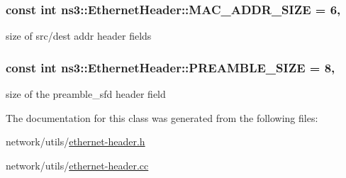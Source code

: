 \subsubsection[{\texorpdfstring{M\+A\+C\+\_\+\+A\+D\+D\+R\+\_\+\+S\+I\+ZE}{MAC_ADDR_SIZE}}]{\setlength{\rightskip}{0pt plus 5cm}const int ns3\+::\+Ethernet\+Header\+::\+M\+A\+C\+\_\+\+A\+D\+D\+R\+\_\+\+S\+I\+ZE = 6\hspace{0.3cm}{\ttfamily [static]}, {\ttfamily [private]}}\hypertarget{classns3_1_1EthernetHeader_a5752d153287d409a29b54f88c1f73cdc}{}\label{classns3_1_1EthernetHeader_a5752d153287d409a29b54f88c1f73cdc}


size of src/dest addr header fields 

\subsubsection[{\texorpdfstring{P\+R\+E\+A\+M\+B\+L\+E\+\_\+\+S\+I\+ZE}{PREAMBLE_SIZE}}]{\setlength{\rightskip}{0pt plus 5cm}const int ns3\+::\+Ethernet\+Header\+::\+P\+R\+E\+A\+M\+B\+L\+E\+\_\+\+S\+I\+ZE = 8\hspace{0.3cm}{\ttfamily [static]}, {\ttfamily [private]}}\hypertarget{classns3_1_1EthernetHeader_a51ace0e75a223cc4ce2a9313e1d4db56}{}\label{classns3_1_1EthernetHeader_a51ace0e75a223cc4ce2a9313e1d4db56}


size of the preamble\+\_\+sfd header field 



The documentation for this class was generated from the following files\+:\begin{DoxyCompactItemize}
\item 
network/utils/\hyperlink{ethernet-header_8h}{ethernet-\/header.\+h}\item 
network/utils/\hyperlink{ethernet-header_8cc}{ethernet-\/header.\+cc}\end{DoxyCompactItemize}
